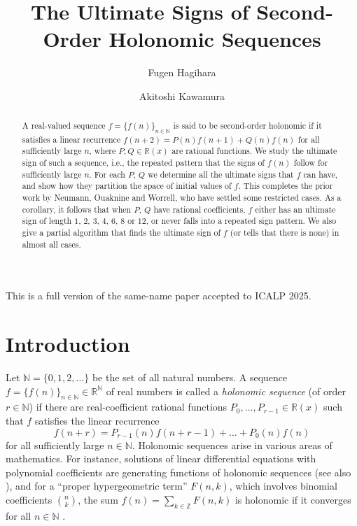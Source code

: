 \documentclass[a4paper,UKenglish,cleveref,autoref,thm-restate]{lipics-v2021}
\author{Fugen Hagihara}{Graduate School of Science, Kyoto University, Japan}{hagihara@kurims.kyoto-u.ac.jp}{}{}
\author{Akitoshi Kawamura}{Research Institute for Mathematical Sciences, Kyoto University, Japan}{kawamura@kurims.kyoto-u.ac.jp}{}{}
\title{The Ultimate Signs of Second-Order Holonomic Sequences}
\newcommand{\R}{\mathbb{R}}
\newcommand{\N}{\mathbb{N}}
\newcommand{\Z}{\mathbb{Z}}
\begin{document}
\maketitle
\begin{abstract}
A real-valued sequence $f = \{f(n)\}_{n \in \N}$ is said to be second-order holonomic if it satisfies a linear recurrence $f (n + 2) = P (n) f (n + 1) + Q (n) f (n)$ for all sufficiently large $n$, where $P, Q \in \R(x)$ are rational functions. We study the ultimate sign of such a sequence, i.e., the repeated pattern that the signs of $f (n)$ follow for sufficiently large $n$.  For each $P$, $Q$ we determine all the ultimate signs that $f$ can have, and show how they partition the space of initial values of $f$.  This completes the prior work by Neumann, Ouaknine and Worrell, who have settled some restricted cases. As a corollary, it follows that when $P$, $Q$ have rational coefficients, $f$ either has an ultimate sign of length $1$, $2$, $3$, $4$, $6$, $8$ or $12$, or never falls into a repeated sign pattern. We also give a partial algorithm that finds the ultimate sign of $f$ (or tells that there is none) in almost all cases.
\end{abstract}

This is a full version of the same-name paper accepted to ICALP 2025. 

\section{Introduction}

Let $\N = \{ 0, 1, 2, \dots \}$ be the set of all natural numbers. 
A sequence $f = \{ f(n) \}_{n \in \N } \in \R^{\N}$ of real numbers is called a 
\emph{holonomic sequence} (of order $r \in \N$)
if there are real-coefficient rational functions $P_0, \dots , P_{r-1} \in \R(x)$ 
such that $f$ satisfies the linear recurrence 
\begin{equation}\label{eq:holonomic}
f(n + r) =  P_{r-1}(n) f(n+r-1) + \dots + P_0(n) f(n)  
\end{equation}
for all sufficiently large $n \in \N$. 
Holonomic sequences arise in various areas of mathematics.
For instance, solutions of linear differential equations with polynomial coefficients are generating functions of holonomic sequences \cite{Sta80} (see also \cite[Appendix B.4]{FS13}), and for a ``proper hypergeometric term'' $F(n, k)$, which involves binomial coefficients $\binom{n}{k}$, the sum $f(n) = \sum_{k \in \Z} F(n, k)$ is holonomic if it converges for all $n \in \N$ \cite{PWZ96}. 
\end{document}
